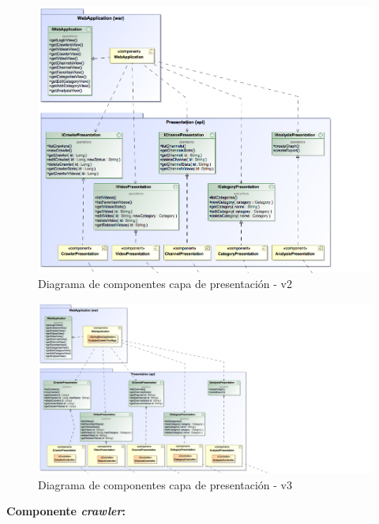 \documentclass[11pt,a4paper]{article}
\begin{document}
\begin{figure}[H]
\centering
\includegraphics[scale=0.3]{diseno/presentacion/ComponentDiagram2.png}
\caption{Diagrama de componentes capa de presentación - v2}
\end{figure}

\begin{figure}[H]
\centering
\includegraphics[scale=0.25]{diseno/presentacion/ComponentDiagram3.png}
\caption{Diagrama de componentes capa de presentación - v3}
\end{figure}

\noindent\textbf{Componente \textit{crawler}:}
\end{document}
